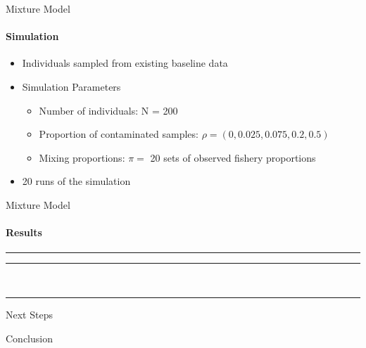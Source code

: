 \documentclass[letter,graphicx]{beamer}
\begin{document}
\begin{frame}{Mixture Model}
\framesubtitle{Simulation}
\begin{itemize}
	\item Individuals sampled from existing baseline data
	\vspace{3mm}
	\item Simulation Parameters
	\begin{itemize}
		\item Number of individuals: N = 200
		\vspace{1.5mm}
		\item Proportion of contaminated samples: $\rho = (0, 0.025, 0.075, 0.2, 0.5)$
		\vspace{1.5mm}
		\item Mixing proportions: $\pi = $ 20 sets of observed fishery proportions
	\end{itemize}
	\vspace{3mm}
	\item 20 runs of the simulation
\end{itemize}
\end{frame}

\begin{frame}{Mixture Model}
\framesubtitle{Results}
\begin{table}
\begin{scriptsize}
\hrule\hrule
\mbox{}\\

\hrule
\end{scriptsize}
\end{table}
\end{frame} 
 
\begin{frame}{Next Steps}
\end{frame}

\begin{frame}{Conclusion}
\end{frame}
\end{document}

